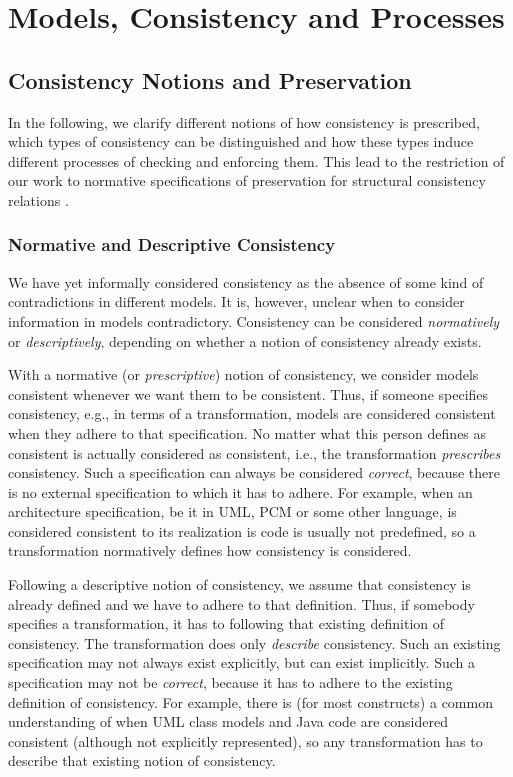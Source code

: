 \chapter{Models, Consistency and Processes
}
\label{chap:networks}


\section{Consistency Notions and Preservation}
\label{chap:networks:notions:normative_descriptive}

In the following, we clarify different notions of how consistency is prescribed, which types of consistency can be distinguished and how these types induce different processes of checking and enforcing them.
This lead to the restriction of our work to normative specifications of preservation for structural consistency relations .

\subsection{Normative and Descriptive Consistency}

We have yet informally considered consistency as the absence of some kind of contradictions in different models.
It is, however, unclear when to consider information in models contradictory.
Consistency can be considered \emph{normatively} or \emph{descriptively}, depending on whether a notion of consistency already exists.

With a normative (or \emph{prescriptive}) notion of consistency, we consider models consistent whenever we want them to be consistent.
Thus, if someone specifies consistency, e.g., in terms of a transformation, models are considered consistent when they adhere to that specification.
No matter what this person defines as consistent is actually considered as consistent, i.e., the transformation \emph{prescribes} consistency.
Such a specification can always be considered \emph{correct}, because there is no external specification to which it has to adhere.
For example, when an architecture specification, be it in \gls{UML}, \gls{PCM} or some other language, is considered consistent to its realization is code is usually not predefined, so a transformation normatively defines how consistency is considered.

Following a descriptive notion of consistency, we assume that consistency is already defined and we have to adhere to that definition.
Thus, if somebody specifies a transformation, it has to following that existing definition of consistency. 
The transformation does only \emph{describe} consistency.
Such an existing specification may not always exist explicitly, but can exist implicitly.
Such a specification may not be \emph{correct}, because it has to adhere to the existing definition of consistency.
For example, there is (for most constructs) a common understanding of when \gls{UML} class models and Java code are considered consistent (although not explicitly represented), so any transformation has to describe that existing notion of consistency.


